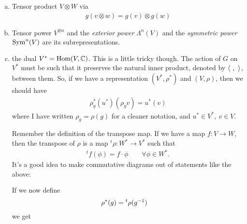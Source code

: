 \begin{enumerate}[(a)]
    \item Tensor product $V\otimes W$ via
        \begin{align}
            g(v\otimes w) = g(v) \otimes g(w)
        \end{align}
    \item Tensor power $V^{\otimes n}$ and the \emph{exterior power}  $\Lambda^n(V)$ and the \emph{symmetric power} $\operatorname{Sym}^n(V)$ are its subrepresentations.
    \item the dual $V^* = \operatorname{Hom}(V,\mathbb{C})$. This is a little tricky though. The action of $G$ on $V^*$ must be such that it preserves the natural inner product, denoted by $\langle\ ,\ \rangle$, between them. So, if we have a representation $(V^*,\rho^*)$ and $(V,\rho)$, then we should have
        \begin{align}
            \rho^*_g(u^*)(\rho_g v) = u^*(v)
        \end{align}
        where I have written $\rho_g=\rho(g)$ for a cleaner notation, and $u^*\in V^*,\ v\in V$. 
        \begin{insight}
            Remember the definition of the transpose map. If we have a map $f: V\to W$, then the transpose of $\rho$ is a map $^t\rho: W^*\to V^*$ such that
            \begin{align}
                ^tf(\phi) = f\cdot \phi \quad\quad\forall \phi\in W^*.
            \end{align}
            It's a good idea to make commutative diagrams out of statements like the above:
            \begin{center}
            \end{center}
        \end{insight}
        If we now define
        \begin{align}
            \rho^*(g) &= \prescript{t}{}\rho(g^{-1})
            \label{eqn:defn_dualrep}
        \end{align}
        we get
        \begin{align*}

\end{align*}
\end{enumerate}
